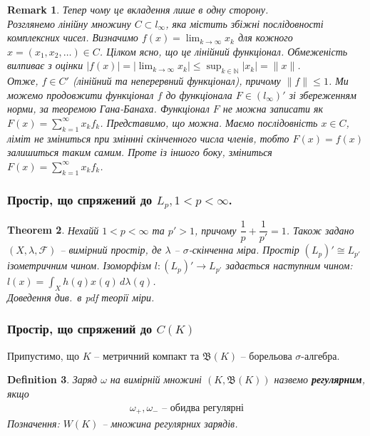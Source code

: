 \documentclass[a4paper, 10pt]{article}
\theoremstyle{theoremdd}
\newtheorem{theorem}{Theorem}[subsection]
\theoremstyle{theoremdd}
\newtheorem{definition}[theorem]{Definition}
\theoremstyle{theoremdd}
\theoremstyle{theoremdd}
\theoremstyle{theoremdd}
\theoremstyle{theoremdd}
\newtheorem{remark}[theorem]{Remark}
\theoremstyle{theoremdd}
\theoremstyle{theoremdd}
\begin{document}
\begin{remark}
Тепер чому це вкладення лише в одну сторону.\\
Розглянемо лінійну множину $C \subset l_\infty$, яка містить збіжні послідовності комплексних чисел. Визначимо $f(x) = \displaystyle\lim_{k \to \infty} x_k$ для кожного $x = (x_1,x_2,\dots) \in C$. Цілком ясно, що це лінійний функціонал. Обмеженість вилпиває з оцінки $|f(x)| = \displaystyle \left| \lim_{k \to \infty} x_k \right| \leq \sup_{k \in \mathbb{N}} |x_k| = \|x\|$.\\
Отже, $f \in C'$ (лінійний та неперервний функціонал), причому $\|f\| \leq 1$. Ми можемо продовжити функціонал $f$ до функціонала $F \in (l_\infty)'$ зі збереженням норми, за теоремою Гана-Банаха. Функціонал $F$ не можна записати як $F(x) = \displaystyle\sum_{k=1}^\infty x_k f_k$. Представимо, що можна. Маємо послідовність $x \in C$, ліміт не зміниться при зміннні скінченного числа членів, тобто $F(x) = f(x)$ залишиться таким самим. Проте із іншого боку, зміниться $F(x) = \displaystyle\sum_{k=1}^\infty x_k f_k$.
\end{remark}

\subsubsection{Простір, що спряжений до $L_p, 1 < p < \infty$.}
\begin{theorem}
Нехайй $1 < p < \infty$ та $p' > 1$, причому $\dfrac{1}{p} + \dfrac{1}{p'} = 1$. Також задано $(X,\lambda,\mathcal{F})$ -- вимірний простір, де $\lambda$ -- $\sigma$-скінченна міра. Простір $(L_p)' \cong L_{p'}$ ізометричним чином. Ізоморфізм $l \colon (L_p)' \to L_{p'}$ задається наступним чином:\\
$l(x) = \displaystyle\int_X h(q) x(q)\,d\lambda(q)$.\\
\textit{Доведення див.\ в pdf теорії міри.}
\end{theorem}

\subsubsection{Простір, що спряжений до $C(K)$}
Припустимо, що $K$ -- метричний компакт та $\mathfrak{B}(K)$ -- борельова $\sigma$-алгебра.

\begin{definition}
Заряд $\omega$ на вимірній множині $(K, \mathfrak{B}(K))$ назвемо \textbf{регулярним}, якщо
\begin{align*}
\omega_+, \omega_- \text{ -- обидва регулярні}
\end{align*}
Позначення: $W(K)$ -- множина регулярних зарядів.
\end{definition}
\end{document}
